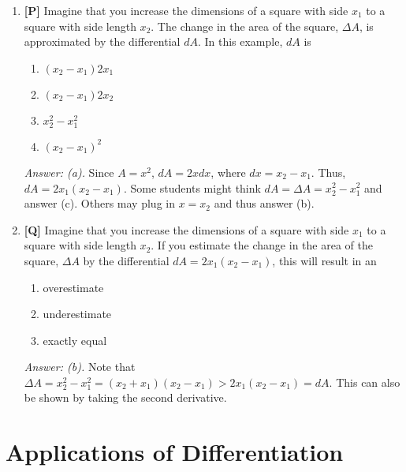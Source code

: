 \documentclass[12pt]{article}
\begin{document}
\begin{enumerate}
{\it Answer: (a).} If you use this problem following number 2, III clearly does not apply, and IV does not hold because we need an additional constant factor of $4\pi$. Since the skin is very thin, the radius of the orange $R$ is approximately the radius 
of the edible part $r$, so are their respective surface areas. More exactly,
$$\frac{\Delta V}{\Delta x}=\frac{4}{3}\pi \frac{R^3-r^3}{R-r}=\frac{4}{3}\pi (R^2+rR+r^2)\approx 4\pi R^2 (\approx 4\pi r^2)$$

\bigskip

\item {\bf [P]} Imagine that you increase the dimensions of a square with side $x_1$ to a square with side length $x_2$. The change in the area of the square, 
$\Delta A$, is approximated by the differential $dA$. In this example, $dA$ is
\begin {enumerate}
\item $(x_2-x_1)2x_1$
\item $(x_2-x_1)2x_2$
\item $x_2^2-x_1^2$
\item $(x_2-x_1)^2$
\end {enumerate}

{\it Answer: (a).} Since $A=x^2$, $dA=2x dx$, where $dx=x_2-x_1$. Thus, $dA=2x_1(x_2-x_1)$. Some students might think $dA=\Delta A=x_2^2-x_1^2$ and answer (c). Others may plug in $x=x_2$ and thus answer (b).

\bigskip

\item {\bf [Q]} Imagine that you increase the dimensions of a square with side $x_1$ to a square with side length $x_2$. If you estimate the change in the area
 of the square, $\Delta A$ by the differential $dA=2x_1(x_2-x_1)$, this will result in an
\begin {enumerate}
\item overestimate
\item underestimate
\item exactly equal
\end {enumerate}

{\it Answer: (b).} 
Note that $\Delta A=x_2^2-x_1^2=(x_2+x_1)(x_2-x_1)>2x_1(x_2-x_1)=dA$. This can also be shown by taking the second derivative.

\end{enumerate}

\pagebreak
\section{Applications of Differentiation}
\end{document}

